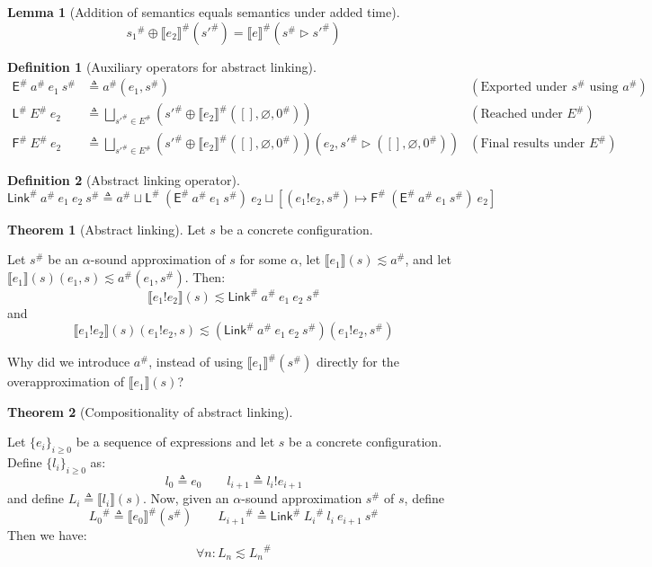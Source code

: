\documentclass[acmsmall,screen,review]{acmart}
\theoremstyle{definition}
\newtheorem{definition}{Definition}[section]
\newtheorem{lem}{Lemma}[section]
\newtheorem{thm}{Theorem}[section]
\newcommand*{\A}[1]{{#1}^{\#}}
\newcommand*{\link}[2]{{#1}\mathtt{!}{#2}}
\newcommand*{\EE}{\mathsf{E}}
\newcommand*{\LL}{\mathsf{L}}
\newcommand*{\Link}{\mathsf{Link}}
\newcommand*{\sembracket}[1]{\lBrack{#1}\rBrack}
\begin{document}
\begin{lem}[Addition of semantics equals semantics under added time]
  \[
    \A{s_1}\oplus\A{\sembracket{e_2}}(\A{s'}) = \A{\sembracket{e}}(\A{s}\rhd\A{s'})
  \]
\end{lem}

\begin{definition}[Auxiliary operators for abstract linking]
  \begin{align*}
    \A\EE\:\A{a}\:e_1\:\A{s}   & \triangleq\A{a}(e_1,\A{s})                                                                                                          & (\text{Exported under }\A{s}\text{ using }\A{a}) \\
    \A\LL\:\A{E}\:e_2          & \triangleq\bigsqcup_{\A{s'}\in \A{E}}(\A{s'}\oplus\A{\sembracket{e_2}}([],\varnothing,\A{0}))                                       & (\text{Reached under }\A{E})                     \\
    \A{\mathsf{F}}\:\A{E}\:e_2 & \triangleq\bigsqcup_{\A{s'}\in \A{E}}(\A{s'}\oplus\A{\sembracket{e_2}}([],\varnothing,\A{0}))(e_2,\A{s'}\rhd([],\varnothing,\A{0})) & (\text{Final results under }\A{E})
  \end{align*}
\end{definition}

\begin{definition}[Abstract linking operator]
  \[
    \A\Link\:\A{a}\:e_1\:e_2\:\A{s}\triangleq\A{a}\sqcup\A\LL\:(\A\EE\:\A{a}\:e_1\:\A{s})\:e_2\sqcup[(\link{e_1}{e_2},\A{s})\mapsto\A{\mathsf{F}}\:(\A\EE\:\A{a}\:e_1\:\A{s})\:e_2]
  \]
\end{definition}

\begin{thm}[Abstract linking]
  Let $s$ be a concrete configuration.

  Let $\A{s}$ be an $\alpha$-sound approximation of $s$ for some $\alpha$, let $\sembracket{e_1}(s)\lesssim\A{a}$, and let $\sembracket{e_1}(s)(e_1,s)\lesssim\A{a}(e_1,\A{s})$. Then:
  \[
    \sembracket{\link{e_1}{e_2}}(s)\lesssim\A\Link\:\A{a}\:e_1\:e_2\:\A{s}
  \]
  and
  \[
    \sembracket{\link{e_1}{e_2}}(s)(\link{e_1}{e_2},s)\lesssim(\A\Link\:\A{a}\:e_1\:e_2\:\A{s})(\link{e_1}{e_2},\A{s})
  \]
\end{thm}

Why did we introduce $\A{a}$, instead of using $\A{\sembracket{e_1}}(\A{s})$ directly for the overapproximation of $\sembracket{e_1}(s)$?

\begin{thm}[Compositionality of abstract linking]
  $\:$

  Let $\{e_i\}_{i\ge 0}$ be a sequence of expressions and let $s$ be a concrete configuration. Define $\{l_i\}_{i\ge 0}$ as:
  \[
    l_0\triangleq e_0\qquad l_{i+1}\triangleq\link{l_i}{e_{i+1}}
  \]
  and define $L_i\triangleq\sembracket{l_i}(s)$. Now, given an $\alpha$-sound approximation $\A{s}$ of $s$, define
  \[
    \A{L_0}\triangleq\A{\sembracket{e_0}}(\A{s})\qquad\A{L_{i+1}}\triangleq\A\Link\:\A{L_i}\:l_i\:e_{i+1}\:\A{s}
  \]
  Then we have:
  \[
    \forall n:L_n\lesssim\A{L_n}
  \]
\end{thm}

\end{document}
